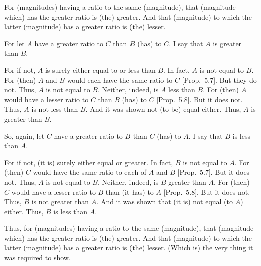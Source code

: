 \begin{Parallel}{}{}
{For (magnitudes) having a ratio to the same (magnitude), that (magnitude which) has the
greater ratio is (the) greater. And that (magnitude) to which the latter (magnitude) has a greater ratio is (the)
lesser.

\epsfysize=0.5in
\centerline{}

For let $A$ have a greater ratio to $C$ than $B$ (has) to $C$. I say that $A$ is greater than $B$.

For if not, $A$ is surely either equal to or less than $B$. In fact, $A$ is not
equal to $B$. For (then) $A$ and $B$ would each have the same ratio to $C$ 
 [Prop.~5.7]. But they do not. Thus, $A$
 is not equal to $B$. Neither, indeed, is $A$ less than $B$. For (then)
 $A$ would have a lesser ratio to $C$ than $B$ (has) to $C$ [Prop.~5.8]. But it does not. Thus, $A$ is not less
 than $B$. And it was shown not (to be) equal either. Thus, $A$ is greater than $B$.
 
 So, again, let $C$ have a greater ratio to $B$ than $C$ (has) to $A$. I say that
 $B$ is less than $A$.
 
 For if not, (it is) surely either equal or greater. In fact, $B$ is not equal to 
 $A$. For (then) $C$ would have the same ratio to each of $A$ and $B$  [Prop.~5.7]. But it does not. Thus, $A$ is not equal to $B$. 
 Neither, indeed, is $B$ greater than $A$. For (then) $C$ would have a lesser
 ratio to $B$ than (it has) to $A$ [Prop.~5.8].
 But it does not. Thus, $B$ is not greater than $A$. And it was shown that
  (it is) not equal (to $A$) either. Thus, $B$ is less than $A$.
  
 Thus, for (magnitudes) having a ratio to the same (magnitude), that (magnitude which)
 has the greater  ratio is (the) greater. And that (magnitude) to which the latter (magnitude) has a greater ratio is (the)
lesser. (Which is) the very thing it was required to show.}
\end{Parallel}

